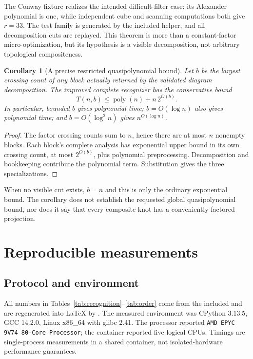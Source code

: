 \documentclass[11pt,a4paper]{article}
\newtheorem{corollary}[theorem]{Corollary}
\theoremstyle{definition}\newtheorem{remark}[theorem]{Remark}
\newcommand{\poly}{\operatorname{poly}}
\begin{document}
The Conway fixture realizes the intended difficult-filter case: its Alexander
polynomial is one, while independent cube and scanning computations both give
$r=33$. The test family is generated by the included 
helper, and all decomposition cuts are replayed. This theorem is more than a
constant-factor micro-optimization, but its hypothesis is a visible decomposition,
not arbitrary topological compositeness.

\begin{corollary}[A precise restricted quasipolynomial bound]
Let $b$ be the largest crossing count of any block actually returned by the
validated diagram decomposition. The improved complete recognizer has the
conservative bound
\[
T(n,b)\le\poly(n)+n\,2^{O(b)}.
\]
In particular, bounded $b$ gives polynomial time; $b=O(\log n)$ also gives
polynomial time; and $b=O(\log^2 n)$ gives $n^{O(\log n)}$.
\end{corollary}
\begin{proof}
The factor crossing counts sum to $n$, hence there are at most $n$ nonempty
blocks. Each block's complete analysis has exponential upper bound in its own
crossing count, at most $2^{O(b)}$, plus polynomial preprocessing. Decomposition
and bookkeeping contribute the polynomial term. Substitution gives the three
specializations.
\end{proof}

When no visible cut exists, $b=n$ and this is only the ordinary exponential
bound. The corollary does not establish the requested global quasipolynomial
bound, nor does it say that every composite knot has a conveniently factored
projection.

\section{Reproducible measurements}
\label{sec:bench}
\subsection{Protocol and environment}
All numbers in Tables~\ref{tab:recognition}--\ref{tab:order} come from the
included  and are regenerated into LaTeX by
. The measured environment was CPython
3.13.5, GCC 14.2.0, Linux x86\_64 with glibc 2.41. The processor reported
\texttt{AMD EPYC 9V74 80-Core Processor}; the container reported five logical
CPUs. Timings are single-process measurements in a shared container, not
isolated-hardware performance guarantees.
\end{document}

